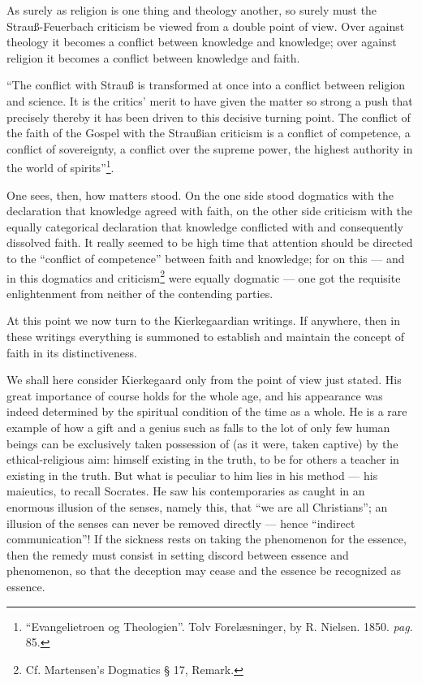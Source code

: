 \documentclass[12pt,a4paper]{book}
\newcommand{\opage}[1]{\marginnote{\footnotesize\textit{[#1]}}}
\begin{document}
As surely as religion is one thing and theology another, so surely must the
Strauß-Feuerbach criticism be viewed from a double point of view. Over against
theology it becomes a conflict between knowledge and knowledge; over against
religion it becomes a conflict between knowledge and faith.

``The conflict with Strauß is transformed at once into a conflict between
religion and science. It is the critics' merit to have given the matter so
strong a push that precisely thereby it has been driven to this decisive
turning point. The conflict of the faith of the Gospel with the Straußian
criticism is a conflict of competence, a conflict of sovereignty, a conflict
over the supreme power, the highest authority in the world of
spirits''\footnote{``Evangelietroen og Theologien''. Tolv Forelæsninger, by
R. Nielsen. 1850. \textit{pag.} 85.}.

One sees, then, how matters stood. On the one side stood dogmatics with the
declaration that knowledge agreed with faith, on the other side criticism with
the equally categorical declaration that knowledge conflicted with and
consequently dissolved faith. It really seemed to be high time that
\opage{19}\setcounter{footnote}{0}%
attention should be directed to the ``conflict of competence'' between faith
and knowledge; for on this --- and in this dogmatics and criticism\footnote{Cf.
Martensen's Dogmatics § 17, Remark.} were equally dogmatic --- one got the
requisite enlightenment from neither of the contending parties.

At this point we now turn to the Kierkegaardian writings. If anywhere, then in
these writings everything is summoned to establish and maintain the concept of
faith in its distinctiveness.

We shall here consider Kierkegaard only from the point of view just stated. His
great importance of course holds for the whole age, and his appearance was
indeed determined by the spiritual condition of the time as a whole. He is a
rare example of how a gift and a genius such as falls to the lot of only few
human beings can be exclusively taken possession of (as it were, taken captive) by
the ethical-religious aim: himself existing in the truth, to be for others a
teacher in existing in the truth. But what is peculiar to him lies in his
method --- his maieutics, to recall Socrates. He saw his contemporaries as
caught in an enormous illusion of the senses, namely this, that ``we are all
Christians''; an illusion of the senses can never be removed directly ---
hence ``indirect communication''! If the sickness rests on taking the phenomenon
for the essence, then the remedy must consist in setting discord between
essence and phenomenon, so that the deception may cease and the essence be
recognized as essence.
\end{document}
